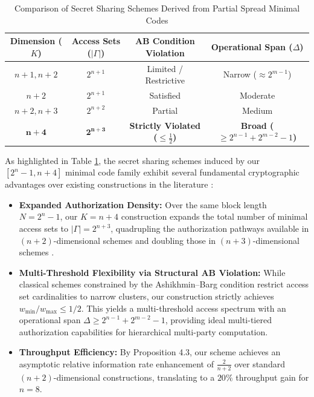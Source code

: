 \documentclass[pdflatex,sn-mathphys-num]{sn-jnl}%
\theoremstyle{thmstyleone}%
\theoremstyle{thmstyletwo}%
\theoremstyle{thmstylethree}%
\begin{document}
\begin{table}[htbp]
\centering
\small
\caption{Comparison of Secret Sharing Schemes Derived from Partial Spread Minimal Codes}
\label{tab:SSS_Comparison}
\begin{tabular}{|c|c|c|c|}
\hline
  \textbf{Dimension ($K$)} & \textbf{Access Sets ($|\Gamma|$)} & \textbf{AB Condition Violation} & \textbf{Operational Span ($\Delta$)} \\ \hline
  $n+1, n+2$ & $2^{n+1}$\cite{LiuLiao2022} & Limited / Restrictive & Narrow ($\approx 2^{m-1}$) \\ \hline
 $n+2$ & $2^{n+1}$\cite{LiYue2020} & Satisfied & Moderate \\ \hline
  $n+2, n+3$ & $2^{n+2}$\cite{MesnagerQianCaoYuan2023} & Partial & Medium \\ \hline
$\mathbf{n+4}$ & $\mathbf{2^{n+3}}$ & \textbf{Strictly Violated ($\le \frac{1}{2}$)} & \textbf{Broad ($\ge 2^{n-1}+2^{m-2}-1$)} \\ \hline
\end{tabular}
\end{table}



As highlighted in Table \ref{tab:SSS_Comparison}, the secret sharing schemes induced by our $[2^n-1, n+4]$ minimal code family exhibit several fundamental cryptographic advantages over existing constructions in the literature \cite{LiYue2020, LiuLiao2022, MesnagerQianCaoYuan2023}:
\begin{itemize}
    \item \textbf{Expanded Authorization Density:} Over the same block length $N = 2^n-1$, our $K = n+4$ construction expands the total number of minimal access sets to $|\Gamma| = 2^{n+3}$, quadrupling the authorization pathways available in $(n+2)$-dimensional schemes \cite{LiuLiao2022} and doubling those in $(n+3)$-dimensional schemes \cite{MesnagerQianCaoYuan2023}.
    \item \textbf{Multi-Threshold Flexibility via Structural AB Violation:} While classical schemes constrained by the Ashikhmin--Barg condition \cite{AshikhminBarg1998, CarletDingYuan2005} restrict access set cardinalities to narrow clusters, our construction strictly achieves $w_{\min}/w_{\max} \le 1/2$. This yields a multi-threshold access spectrum with an operational span $\Delta \ge 2^{n-1} + 2^{m-2} - 1$, providing ideal multi-tiered authorization capabilities for hierarchical multi-party computation.
    \item \textbf{Throughput Efficiency:} By Proposition 4.3, our scheme achieves an asymptotic relative information rate enhancement of $\frac{2}{n+2}$ over standard $(n+2)$-dimensional constructions, translating to a $20\%$ throughput gain for $n=8$.
\end{itemize}
\end{document}
